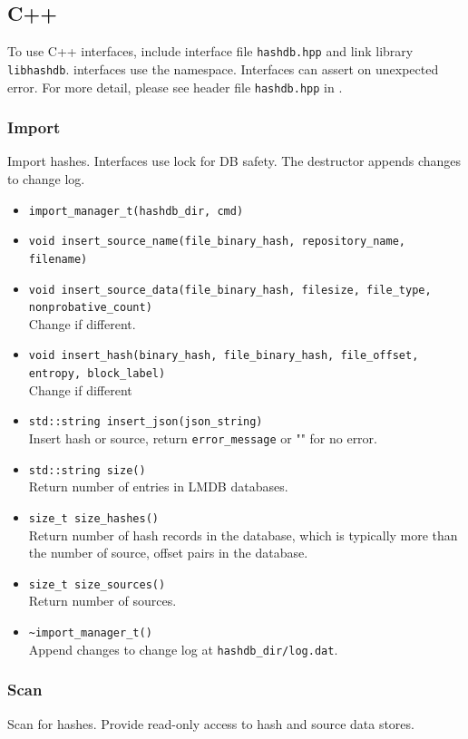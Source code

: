 \documentclass[11pt,fleqn]{article} %
\begin{document}
\subsection{C++}
To use C++ interfaces, include interface file \verb+hashdb.hpp+ and link \hdb library \verb+libhashdb+. \hdb interfaces use the \hdb namespace. Interfaces can assert on unexpected error. For more detail, please see \hdb header file \texttt{hashdb.hpp} in \textbf{}.\\

\subsubsection{Import}
Import hashes. Interfaces use lock for DB safety. The destructor appends changes to change log.

\begin{itemize}
\item \verb+import_manager_t(hashdb_dir, cmd)+
\item \verb+void insert_source_name(file_binary_hash, repository_name, filename)+
\item \verb+void insert_source_data(file_binary_hash, filesize, file_type, nonprobative_count)+\\
Change if different.
\item \verb+void insert_hash(binary_hash, file_binary_hash, file_offset, entropy, block_label)+\\
Change if different
\item \verb+std::string insert_json(json_string)+\\
Insert hash or source, return \verb+error_message+ or "" for no error.
\item \verb+std::string size()+\\
Return number of entries in LMDB databases.
\item \verb+size_t size_hashes()+\\
Return number of hash records in the database, which is typically more than the number of source, offset pairs in the database.
\item \verb+size_t size_sources()+\\
Return number of sources.
\item \verb+~import_manager_t()+\\
Append changes to change log at \verb+hashdb_dir/log.dat+.
\end{itemize}

\subsubsection{Scan}
Scan for hashes. Provide read-only access to hash and source data stores.
\end{document}
